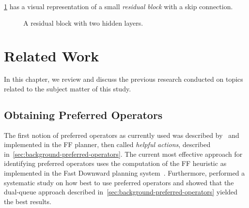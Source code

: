 \documentclass[ppgc,diss,english]{iiufrgs}
\begin{document}
\cref{fig:residual-block} has a visual representation of a small \emph{residual block} with a skip connection.

\begin{figure}[ht]
\caption[A residual block]{A residual block with two hidden layers.}
\vspace{\baselineskip}
\centering
{}
\label{fig:residual-block}
\end{figure}


\chapter{Related Work}
\label{cha:related-work}
In this chapter, we review and discuss the previous research conducted on topics related to the subject matter of this study.

\section{Obtaining Preferred Operators}
\label{sec:related-pos}
The first notion of preferred operators as currently used was described by~\citet{Hoffmann.Nebel/2001} and implemented in the FF planner, then called \emph{helpful actions}, described in~\cref{sec:background-preferred-operators}. The current most effective approach for identifying preferred operators uses the computation of the FF heuristic as implemented in the Fast Downward planning system~\cite{Helmert/2006}.
Furthermore, \citet{Richter.Helmert/2009} performed a systematic study on how best to use preferred operators and showed that the dual-queue approach described in~\cref{sec:background-preferred-operators} yielded the best results.
\end{document}
